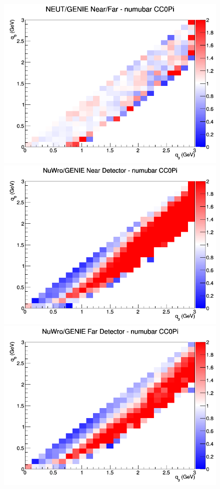\documentclass[12pt]{article}
\begin{document}
\begin{figure}[h]
\endminipage
{}
\includegraphics[width=\linewidth]{q0_q3/nominal/ratios/CC0Pi_NEUT_GENIE_numubar_NF_q3_q0.png}
\endminipage
\newline
{}
\includegraphics[width=\linewidth]{q0_q3/nominal/ratios/CC0Pi_NuWro_GENIE_numubar_near_q3_q0.png}
\endminipage
{}
\includegraphics[width=\linewidth]{q0_q3/nominal/ratios/CC0Pi_NuWro_GENIE_numubar_far_q3_q0.png}

\end{figure}
\end{document}
